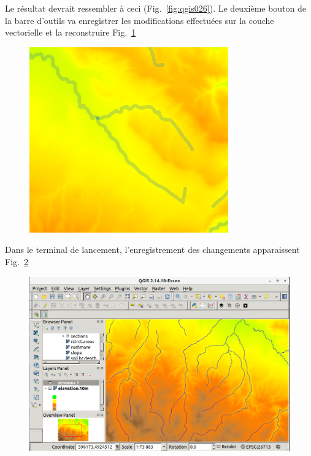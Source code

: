 Le r\'esultat devrait ressembler \`a ceci (Fig.~\ref{fig:qgis026}). Le deuxi\`eme bouton de la barre d'outils va enregistrer les modifications effectu\'ees sur la couche vectorielle et la reconstruire Fig.~\ref{fig:qgis027}

\begin{figure}[htbp]
   \centering
   \includegraphics[scale=0.35]{qgis027.png}
   \caption{}
   \label{fig:qgis027}
\end{figure}

Dans le terminal de lancement, l'enregistrement des changements apparaissent Fig.~\ref{fig:qgis028}

\begin{figure}[htbp]
   \centering
   \includegraphics[scale=0.20]{qgis028.png}
   \caption{}
   \label{fig:qgis028}
\end{figure}

